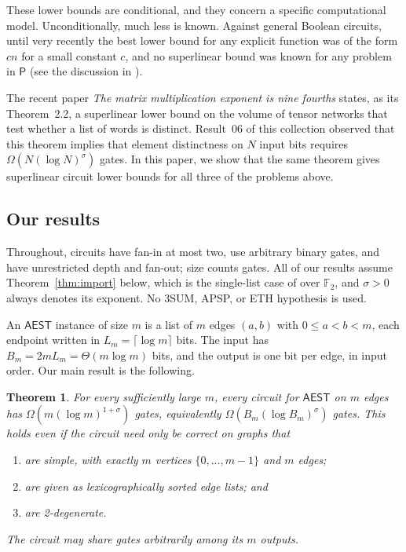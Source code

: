 \documentclass[11pt]{article}
\newtheorem{theorem}{Theorem}[section]
\theoremstyle{definition}
\theoremstyle{remark}
\newcommand{\F}{\mathbb{F}}
\newcommand{\AEST}{\mathsf{AEST}}
\begin{document}
These lower bounds are conditional, and they concern a specific
computational model. Unconditionally, much less is known. Against general
Boolean circuits, until very recently the best lower bound for any
explicit function was of the form $cn$ for a small constant $c$, and no
superlinear bound was known for any problem in $\mathsf P$ (see the
discussion in \cite{R06}).

The recent paper \emph{The matrix multiplication exponent is nine fourths}
\cite{OAI} states, as its Theorem~2.2, a superlinear lower bound on the
volume of tensor networks that test whether a list of words is distinct.
Result~06 of this collection \cite{R06} observed that this theorem implies
that element distinctness on $N$ input bits requires
$\Omega(N(\log N)^{\sigma})$ gates. In this paper, we show that the same
theorem gives superlinear circuit lower bounds for all three of the
problems above.

\subsection{Our results}

Throughout, circuits have fan-in at most two, use arbitrary binary gates,
and have unrestricted depth and fan-out; size counts gates. All of our
results assume Theorem~\ref{thm:import} below, which is the single-list
case of \cite[Theorem~2.2]{OAI} over $\F_2$, and $\sigma>0$ always denotes
its exponent. No 3SUM, APSP, or ETH hypothesis is used.

An $\AEST$ instance of size $m$ is a list of $m$ edges $(a,b)$ with
$0\le a<b<m$, each endpoint written in $L_m=\lceil\log m\rceil$ bits. The
input has $B_m=2mL_m=\Theta(m\log m)$ bits, and the output is one bit per
edge, in input order. Our main result is the following.

\begin{theorem}\label{thm:main}
For every sufficiently large $m$, every circuit for $\AEST$ on $m$ edges
has $\Omega(m(\log m)^{1+\sigma})$ gates, equivalently
$\Omega(B_m(\log B_m)^{\sigma})$ gates. This holds even if the circuit need
only be correct on graphs that
\begin{enumerate}
\item are simple, with exactly $m$ vertices $\{0,\dots,m-1\}$ and $m$ edges;
\item are given as lexicographically sorted edge lists; and
\item are 2-degenerate.
\end{enumerate}
The circuit may share gates arbitrarily among its $m$ outputs.
\end{theorem}
\end{document}
